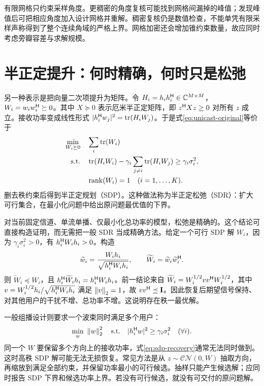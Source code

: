 有限网格只约束采样角度。更稠密的角度复核可能找到网格间漏掉的峰值；发现峰值后可把相应角度加入设计网格并重解。稠密复核仍是数值检查，不能单凭有限采样声称得到了整个连续角域的严格上界。网格加密还会增加锥约束数量，故应同时考虑旁瓣容差与求解规模。

\section{半正定提升：何时精确，何时只是松弛}
另一种表示是把向量二次项提升为矩阵。令 $H_i=h_ih_i^\mathsf H\in\mathbb C^{M\times M}$，$W_i=w_iw_i^\mathsf H\succeq0$。其中 $X\succeq0$ 表示厄米半正定矩阵，即 $z^\mathsf H Xz\geq0$ 对所有 $z$ 成立。接收功率变成线性形式 $|h_i^\mathsf H w_j|^2=\operatorname{tr}(H_iW_j)$。于是式\eqref{eq:unicast-original}等价于
\begin{equation}
 \begin{aligned}
 \min_{W_i\succeq0}\quad&\sum_i\operatorname{tr}(W_i)\\
 \text{s.t.}\quad&\operatorname{tr}(H_iW_i)-\gamma_i\sum_{j\ne i}\operatorname{tr}(H_iW_j)
 \geq\gamma_i\sigma_i^2,\\
 &\operatorname{rank}(W_i)=1\quad(i=1,\ldots,K).
 \end{aligned}
 \label{eq:beam-rank}
\end{equation}
删去秩约束后得到半正定规划（SDP）。这种做法称为半正定松弛（SDR）：扩大可行集合，在最小化问题中给出原问题最优值的下界\cite{luo2010}。

对当前固定信道、单流单播、仅最小化总功率的模型，松弛是精确的。这个结论可直接构造证明，而无需把一般 SDR 当成精确方法。给定一个可行 SDP 解 $W_i$，因为 $\gamma_i\sigma_i^2>0$，有 $h_i^\mathsf H W_ih_i>0$。构造
\begin{equation}
 \widetilde w_i=\frac{W_ih_i}{\sqrt{h_i^\mathsf H W_ih_i}},
 \qquad \widetilde W_i=\widetilde w_i\widetilde w_i^\mathsf H.
 \label{eq:sdp-recovery}
\end{equation}
则 $\widetilde W_i\preceq W_i$，且 $h_i^\mathsf H\widetilde W_ih_i=h_i^\mathsf H W_ih_i$。前一结论来自
$\widetilde W_i=W_i^{1/2}vv^\mathsf H W_i^{1/2}$，其中
$v=W_i^{1/2}h_i/\sqrt{h_i^\mathsf H W_ih_i}$ 满足 $\left\lVert v\right\rVert_2=1$，故 $vv^\mathsf H\preceq\mathbf I$。因此恢复后期望信号保持、对其他用户的干扰不增、总功率不增。这说明存在秩一最优解。

一般组播设计则要求一个波束同时满足多个用户：
\begin{equation}
 \min_w\ \left\lVert w\right\rVert_2^2
 \quad\text{s.t.}\quad |h_i^\mathsf H w|^2\geq\gamma_i\sigma_i^2\quad(\forall i).
\end{equation}
同一个 $W$ 要保留多个方向上的接收功率，式\eqref{eq:sdp-recovery}通常无法同时做到。这时高秩 SDP 解可能无法无损恢复。常见方法是从 $z\sim\mathcal{CN}(0,W)$ 抽取方向，再缩放到满足全部约束，并保留功率最小的可行候选。抽样只能产生候选解；应同时报告 SDP 下界和候选功率上界。若没有可行候选，就没有可交付的原问题解。

